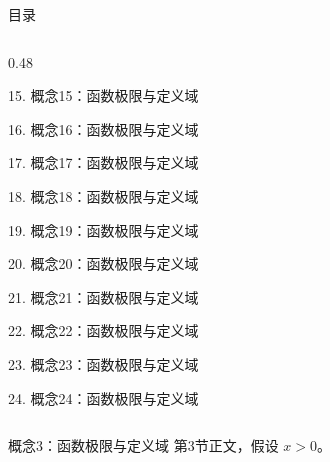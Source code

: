 \documentclass[aspectratio=169,10pt,fontset=fandol]{ctexbeamer}
\begin{document}
\begin{frame}[t,fragile]{目录}
\begin{columns}[T,onlytextwidth]
\begin{column}{0.48\textwidth}
{\color{gray!40}\small 15. 概念15：函数极限与定义域\par}\vspace{0.22em}
{\color{gray!40}\small 16. 概念16：函数极限与定义域\par}\vspace{0.22em}
{\color{gray!40}\small 17. 概念17：函数极限与定义域\par}\vspace{0.22em}
{\color{gray!40}\small 18. 概念18：函数极限与定义域\par}\vspace{0.22em}
{\color{gray!40}\small 19. 概念19：函数极限与定义域\par}\vspace{0.22em}
{\color{gray!40}\small 20. 概念20：函数极限与定义域\par}\vspace{0.22em}
{\color{gray!40}\small 21. 概念21：函数极限与定义域\par}\vspace{0.22em}
{\color{gray!40}\small 22. 概念22：函数极限与定义域\par}\vspace{0.22em}
{\color{gray!40}\small 23. 概念23：函数极限与定义域\par}\vspace{0.22em}
{\color{gray!40}\small 24. 概念24：函数极限与定义域\par}\vspace{0.22em}
\end{column}
\end{columns}
\end{frame}
\begin{frame}[t,fragile]{概念3：函数极限与定义域}
\normalsize
{\normalsize
第3节正文，假设 $x>0$。
}
\end{frame}
\end{document}
